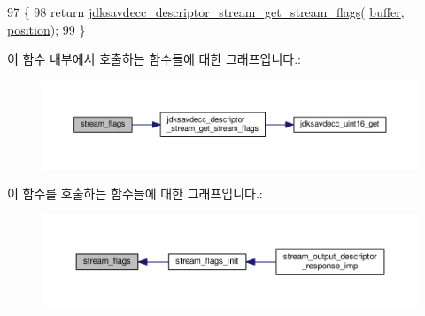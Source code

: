 \begin{DoxyCode}
97 \{
98     \textcolor{keywordflow}{return} \hyperlink{group__descriptor__stream_gadf24dddf6aa85617cc44caf19a7df7c4}{jdksavdecc\_descriptor\_stream\_get\_stream\_flags}(
      \hyperlink{classavdecc__lib_1_1descriptor__response__base__imp_a56ed84df35de10bdb65e72b184309497}{buffer}, \hyperlink{classavdecc__lib_1_1descriptor__response__base__imp_a7a04afe5347934be732ec70a70bd0a28}{position});
99 \}
\end{DoxyCode}


이 함수 내부에서 호출하는 함수들에 대한 그래프입니다.\+:
\nopagebreak
\begin{figure}[H]
\begin{center}
\leavevmode
\includegraphics[width=350pt]{classavdecc__lib_1_1stream__output__descriptor__response__imp_ae2c7ef21d6748f8c665984ab3328f75f_cgraph}
\end{center}
\end{figure}




이 함수를 호출하는 함수들에 대한 그래프입니다.\+:
\nopagebreak
\begin{figure}[H]
\begin{center}
\leavevmode
\includegraphics[width=350pt]{classavdecc__lib_1_1stream__output__descriptor__response__imp_ae2c7ef21d6748f8c665984ab3328f75f_icgraph}
\end{center}
\end{figure}


